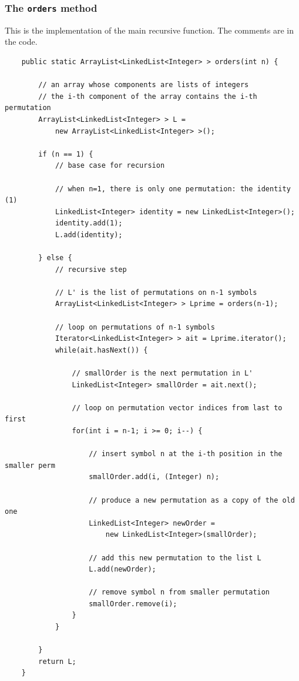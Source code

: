 \documentclass[a4paper]{book}
\theoremstyle{changebreak}                %
\begin{document}
\subsubsection{The {\tt orders} method}
This is the implementation of the main recursive function. The
comments are in the code.
\begin{verbatim}
    public static ArrayList<LinkedList<Integer> > orders(int n) {

        // an array whose components are lists of integers 
        // the i-th component of the array contains the i-th permutation
        ArrayList<LinkedList<Integer> > L = 
            new ArrayList<LinkedList<Integer> >();

        if (n == 1) {
            // base case for recursion

            // when n=1, there is only one permutation: the identity (1)
            LinkedList<Integer> identity = new LinkedList<Integer>();
            identity.add(1);
            L.add(identity);

        } else {
            // recursive step

            // L' is the list of permutations on n-1 symbols
            ArrayList<LinkedList<Integer> > Lprime = orders(n-1);

            // loop on permutations of n-1 symbols
            Iterator<LinkedList<Integer> > ait = Lprime.iterator();
            while(ait.hasNext()) {

                // smallOrder is the next permutation in L'
                LinkedList<Integer> smallOrder = ait.next();

                // loop on permutation vector indices from last to first
                for(int i = n-1; i >= 0; i--) {

                    // insert symbol n at the i-th position in the smaller perm
                    smallOrder.add(i, (Integer) n);

                    // produce a new permutation as a copy of the old one
                    LinkedList<Integer> newOrder = 
                        new LinkedList<Integer>(smallOrder);

                    // add this new permutation to the list L
                    L.add(newOrder);

                    // remove symbol n from smaller permutation
                    smallOrder.remove(i);
                }
            }

        }
        return L;
    }

\end{verbatim}
\end{document}
